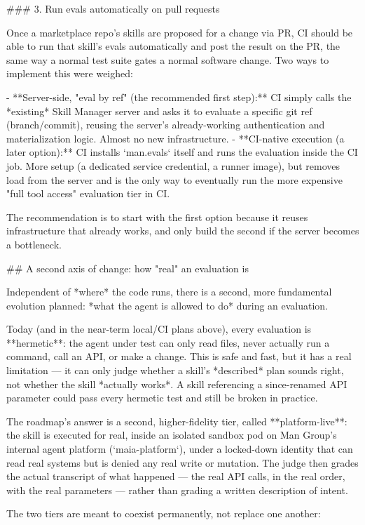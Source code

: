 ### 3. Run evals automatically on pull requests

Once a marketplace repo's skills are proposed for a change via PR, CI should be able to run that skill's evals automatically and post the result on the PR, the same way a normal test suite gates a normal software change.
Two ways to implement this were weighed:

- **Server-side, "eval by ref" (the recommended first step):** CI simply calls the *existing* Skill Manager server and asks it to evaluate a specific git ref (branch/commit), reusing the server's already-working authentication and materialization logic. Almost no new infrastructure.
- **CI-native execution (a later option):** CI installs `man.evals` itself and runs the evaluation inside the CI job. More setup (a dedicated service credential, a runner image), but removes load from the server and is the only way to eventually run the more expensive "full tool access" evaluation tier in CI.

The recommendation is to start with the first option because it reuses infrastructure that already works, and only build the second if the server becomes a bottleneck.

## A second axis of change: how "real" an evaluation is

Independent of *where* the code runs, there is a second, more fundamental evolution planned: *what the agent is allowed to do* during an evaluation.

Today (and in the near-term local/CI plans above), every evaluation is **hermetic**: the agent under test can only read files, never actually run a command, call an API, or make a change.
This is safe and fast, but it has a real limitation — it can only judge whether a skill's *described* plan sounds right, not whether the skill *actually works*. A skill referencing a since-renamed API parameter could pass every hermetic test and still be broken in practice.

The roadmap's answer is a second, higher-fidelity tier, called **platform-live**: the skill is executed for real, inside an isolated sandbox pod on Man Group's internal agent platform (`maia-platform`), under a locked-down identity that can read real systems but is denied any real write or mutation. The judge then grades the actual transcript of what happened — the real API calls, in the real order, with the real parameters — rather than grading a written description of intent.

The two tiers are meant to coexist permanently, not replace one another:

